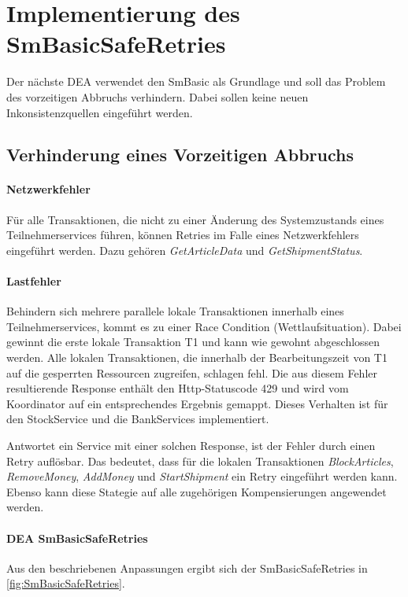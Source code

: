 \section{Implementierung des SmBasicSafeRetries}

Der nächste DEA verwendet den SmBasic als Grundlage und soll das Problem des vorzeitigen Abbruchs verhindern. Dabei sollen keine neuen Inkonsistenzquellen eingeführt werden. 

\subsection{Verhinderung eines Vorzeitigen Abbruchs}

\paragraph*{Netzwerkfehler}
Für alle Transaktionen, die nicht zu einer Änderung des Systemzustands eines Teilnehmerservices führen, können Retries im Falle eines Netzwerkfehlers eingeführt werden. Dazu gehören \textit{GetArticleData} und \textit{GetShipmentStatus}. 

\paragraph*{Lastfehler}
Behindern sich mehrere parallele lokale Transaktionen innerhalb eines Teilnehmerservices, kommt es zu einer Race Condition (Wettlaufsituation). Dabei gewinnt die erste lokale Transaktion T1 und kann wie gewohnt abgeschlossen werden. Alle lokalen Transaktionen, die innerhalb der Bearbeitungszeit von T1 auf die gesperrten Ressourcen zugreifen, schlagen fehl. Die aus diesem Fehler resultierende Response enthält den Http-Statuscode 429 und wird vom Koordinator auf ein entsprechendes Ergebnis gemappt. Dieses Verhalten ist für den StockService und die BankServices implementiert. 

Antwortet ein Service mit einer solchen Response, ist der Fehler durch einen Retry auflösbar. Das bedeutet, dass für die lokalen Transaktionen \textit{BlockArticles}, \textit{RemoveMoney}, \textit{AddMoney} und \textit{StartShipment} ein Retry eingeführt werden kann. Ebenso kann diese Stategie auf alle zugehörigen Kompensierungen angewendet werden.

\paragraph*{DEA SmBasicSafeRetries}
Aus den beschriebenen Anpassungen ergibt sich der SmBasicSafeRetries in \cref{fig:SmBasicSafeRetries}. 

